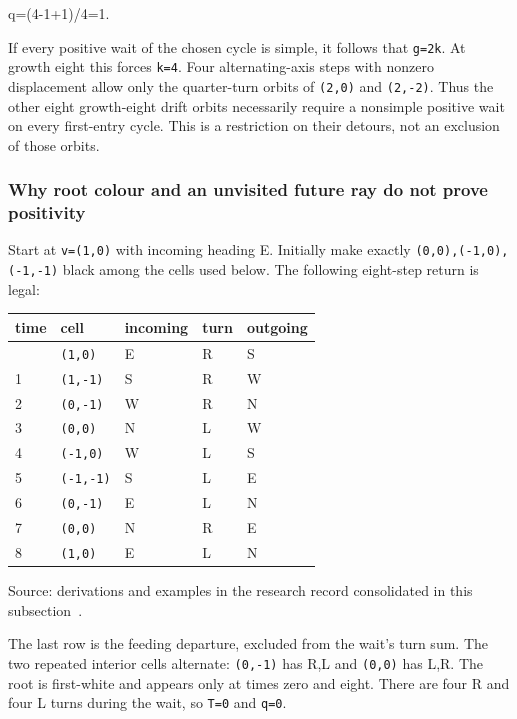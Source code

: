 \documentclass[11pt,letterpaper]{article}
\theoremstyle{plain}
\theoremstyle{definition}
\begin{document}
\begin{NoHyper}
\begin{codeblock}
q=(4-1+1)/4=1.
\end{codeblock}

If every positive wait of the chosen cycle is simple, it follows that \texttt{g=2k}. At growth eight this forces \texttt{k=4}. Four alternating-axis steps with nonzero displacement allow only the quarter-turn orbits of \texttt{(2,0)} and \texttt{(2,-2)}. Thus the other eight growth-eight drift orbits necessarily require a nonsimple positive wait on every first-entry cycle. This is a restriction on their detours, not an exclusion of those orbits.

\subsubsection{Why root colour and an unvisited future ray do not prove positivity}

Start at \texttt{v=(1,0)} with incoming heading E. Initially make exactly \texttt{(0,0),(-1,0),(-1,-1)} black among the cells used below. The following eight-step return is legal:

{\def\LTcaptype{table} %
\begin{longtable}[]{@{}lllll@{}}
\toprule\noalign{}
time & cell & incoming & turn & outgoing \\
\midrule\noalign{}
\endhead
\bottomrule\noalign{}
\endlastfoot
0 & \texttt{(1,0)} & E & R & S \\
1 & \texttt{(1,-1)} & S & R & W \\
2 & \texttt{(0,-1)} & W & R & N \\
3 & \texttt{(0,0)} & N & L & W \\
4 & \texttt{(-1,0)} & W & L & S \\
5 & \texttt{(-1,-1)} & S & L & E \\
6 & \texttt{(0,-1)} & E & L & N \\
7 & \texttt{(0,0)} & N & R & E \\
8 & \texttt{(1,0)} & E & L & N \\
\end{longtable}
{\footnotesize Source: derivations and examples in the research record consolidated in this subsection~\cite{Repo}.\par}
}

The last row is the feeding departure, excluded from the wait's turn sum. The two repeated interior cells alternate: \texttt{(0,-1)} has R,L and \texttt{(0,0)} has L,R. The root is first-white and appears only at times zero and eight. There are four R and four L turns during the wait, so \texttt{T=0} and \texttt{q=0}.


\end{NoHyper}
\end{document}
